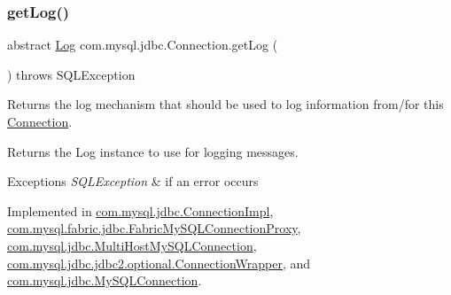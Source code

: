 \subsubsection{\texorpdfstring{get\+Log()}{getLog()}}
{\footnotesize\ttfamily abstract \mbox{\hyperlink{interfacecom_1_1mysql_1_1jdbc_1_1log_1_1_log}{Log}} com.\+mysql.\+jdbc.\+Connection.\+get\+Log (\begin{DoxyParamCaption}{ }\end{DoxyParamCaption}) throws S\+Q\+L\+Exception\hspace{0.3cm}{\ttfamily [abstract]}}

Returns the log mechanism that should be used to log information from/for this \mbox{\hyperlink{interfacecom_1_1mysql_1_1jdbc_1_1_connection}{Connection}}.

\begin{DoxyReturn}{Returns}
the Log instance to use for logging messages. 
\end{DoxyReturn}

\begin{DoxyExceptions}{Exceptions}
{\em S\+Q\+L\+Exception} & if an error occurs \\
\hline
\end{DoxyExceptions}


Implemented in \mbox{\hyperlink{classcom_1_1mysql_1_1jdbc_1_1_connection_impl_ae8304e8374b4789fe5f73120bccb7143}{com.\+mysql.\+jdbc.\+Connection\+Impl}}, \mbox{\hyperlink{classcom_1_1mysql_1_1fabric_1_1jdbc_1_1_fabric_my_s_q_l_connection_proxy_afacff16399aa5929d17910a44c76ee96}{com.\+mysql.\+fabric.\+jdbc.\+Fabric\+My\+S\+Q\+L\+Connection\+Proxy}}, \mbox{\hyperlink{classcom_1_1mysql_1_1jdbc_1_1_multi_host_my_s_q_l_connection_aa844db76fbc95ba7a185cf4df1257800}{com.\+mysql.\+jdbc.\+Multi\+Host\+My\+S\+Q\+L\+Connection}}, \mbox{\hyperlink{classcom_1_1mysql_1_1jdbc_1_1jdbc2_1_1optional_1_1_connection_wrapper_ab6845a61a447081e344ae983d1f424da}{com.\+mysql.\+jdbc.\+jdbc2.\+optional.\+Connection\+Wrapper}}, and \mbox{\hyperlink{interfacecom_1_1mysql_1_1jdbc_1_1_my_s_q_l_connection_a3faf787772351caedf8e95f28c09c4cd}{com.\+mysql.\+jdbc.\+My\+S\+Q\+L\+Connection}}.

